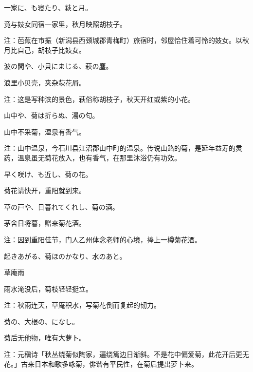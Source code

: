 \begin{haiku}
    {\FH 一家に、も寝たり、萩と月。}

    {\FK 竟与妓女同宿一家里，秋月映照胡枝子。}

    {\FT 注：芭蕉在市振（新潟县西颈城郡青梅町）旅宿时，邻屋恰住着可怜的妓女。以秋月比自己，胡枝子比妓女。}
\end{haiku}

\begin{haiku}
    {\FH 波の間や、小貝にまじる、萩の塵。}

    {\FK 浪里小贝壳，夹杂萩花屑。}

    {\FT 注：这是写种滨的景色，萩俗称胡枝子，秋天开红或紫的小花。}
\end{haiku}

\begin{haiku}
    {\FH 山中や、菊は折らぬ、湯の匂。}

    {\FK 山中不采菊，温泉有香气。}

    {\FT 注：山中温泉，今石川县江沼郡山中町的温泉。传说山路的菊，是延年益寿的灵药，温泉虽无菊花放入，也有香气，在那里沐浴仍有功效。}
\end{haiku}

\begin{haiku}
    {\FH 早く咲け、も近し、菊の花。}

    {\FK 菊花请快开，重阳就到来。}
\end{haiku}

\begin{haiku}
    {\FH 草の戸や、日暮れてくれし、菊の酒。}

    {\FK 茅舍日将暮，赠来菊花酒。}

    {\FT 注：因到重阳佳节，门人乙州体念老师的心境，捧上一樽菊花酒。}
\end{haiku}

\begin{haiku}
    {\FH 起きあがる、菊ほのかなり、水のあと。}

    {\FK 草庵雨}

    {\FK 雨水淹没后，菊枝轻轻挺立。}

    {\FT 注：秋雨连天，草庵积水，写菊花倒而复起的韧力。}
\end{haiku}

\begin{haiku}
    {\FH 菊の、大根の、になし。}

    {\FK 菊后无他物，唯有大萝卜。}

    {\FT 注：元稹诗「秋丛绕菊似陶家，遍绕篱边日渐斜。不是花中偏爱菊，此花开后更无花。」古来日本和歌多咏菊，俳谐有平民性，在菊后提出萝卜来。}
\end{haiku}

